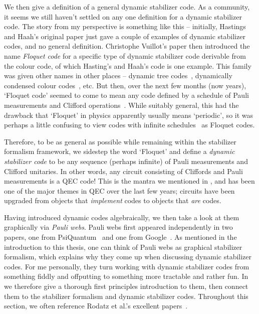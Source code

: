 We then give a definition of a general dynamic stabilizer code.
As a community, it seems we still haven't settled on any one definition for a dynamic stabilizer code.
The story from my perspective is something like this -- initially, Hastings and Haah's original paper just gave a couple of examples of dynamic stabilizer codes, and no general definition.
Christophe Vuillot's paper  then introduced the name \textit{Floquet code} for a specific type of dynamic stabilizer code derivable from the colour code, of which Hasting's and Haah's code is one example.
This family was given other names in other places -- dynamic tree codes~\cite{Davydova_2023}, dynamically condensed colour codes~\cite{Kesselring_2024}, etc.
But then, over the next few months (now years), `Floquet code' seemed to come to mean any code defined by a schedule of Pauli measurements and Clifford operations~\cite{bauer2025xyfloquetcodesimple}.
While suitably general, this had the drawback that `Floquet' in physics apparently usually means `periodic', so it was perhaps a little confusing to view codes with infinite schedules~\cite{gidney2023baconthreshold} as Floquet codes.

Therefore, to be as general as possible while remaining within the stabilizer formalism framework, we sidestep the word `Floquet' and define a \textit{dynamic stabilizer code} to be any sequence (perhaps infinite) of Pauli measurements and Clifford unitaries.
In other words, any circuit consisting of Cliffords and Pauli measurements is a QEC code!
This is the mantra we mentioned in , and has been one of the major themes in QEC over the last few years; circuits have been upgraded from objects that \textit{implement} codes to objects that \textit{are} codes.

Having introduced dynamic codes algebraically, we then take a look at them graphically via \textit{Pauli webs}.
Pauli webs first appeared independently in two papers, one from PsiQuantum~\cite{Bombin_2024} and one from Google~\cite{McEwen_2023}.
As mentioned in the introduction to this thesis, one can think of Pauli webs as graphical stabilizer formalism, which explains why they come up when discussing dynamic stabilizer codes.
For me personally, they turn working with dynamic stabilizer codes from something fiddly and offputting to something more tractable and rather fun.
In  we therefore give a thorough first principles introduction to them, then connect them to the stabilizer formalism and dynamic stabilizer codes.
Throughout this section, we often reference Rodatz et al.'s excellent papers~\cite{rodatz2024floquetifying,rodatz2025faulttoleranceconstruction}.
